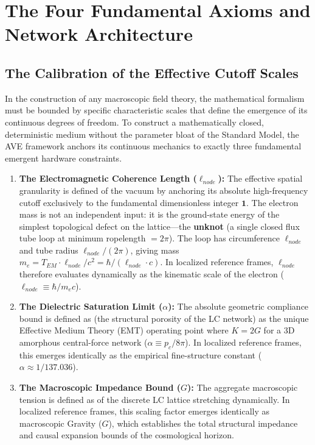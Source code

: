 \chapter{The Four Fundamental Axioms and Network Architecture}
\label{ch:fundamental_axioms}

\section{The Calibration of the Effective Cutoff Scales}
In the construction of any macroscopic field theory, the mathematical formalism must be bounded by specific characteristic scales that define the emergence of its continuous degrees of freedom. To construct a mathematically closed, deterministic medium without the parameter bloat of the Standard Model, the AVE framework anchors its continuous mechanics to exactly three fundamental emergent hardware constraints.

\begin{enumerate}
    \item \textbf{The Electromagnetic Coherence Length ($\ell_{node}$):} The effective spatial granularity is defined of the vacuum by anchoring its absolute high-frequency cutoff exclusively to the fundamental dimensionless integer $\mathbf{1}$. The electron mass is not an independent input: it is the ground-state energy of the simplest topological defect on the lattice---the \textbf{unknot} (a single closed flux tube loop at minimum ropelength $= 2\pi$). The loop has circumference $\ell_{node}$ and tube radius $\ell_{node}/(2\pi)$, giving mass $m_e = T_{EM} \cdot \ell_{node}/c^2 = \hbar/(\ell_{node} \cdot c)$. In localized reference frames, $\ell_{node}$ therefore evaluates dynamically as the kinematic scale of the electron ($\ell_{node} \equiv \hbar / m_e c$). 
    \item \textbf{The Dielectric Saturation Limit ($\alpha$):} The absolute geometric compliance bound is defined as (the structural porosity of the LC network) as the unique Effective Medium Theory (EMT) operating point where $K = 2G$ for a 3D amorphous central-force network ($\alpha \equiv p_c / 8\pi$). In localized reference frames, this emerges identically as the empirical fine-structure constant ($\alpha \approx 1/137.036$).
    \item \textbf{The Macroscopic Impedance Bound ($G$):} The aggregate macroscopic tension is defined as of the discrete LC lattice stretching dynamically. In localized reference frames, this scaling factor emerges identically as macroscopic Gravity ($G$), which establishes the total structural impedance and causal expansion bounds of the cosmological horizon.
\end{enumerate}


